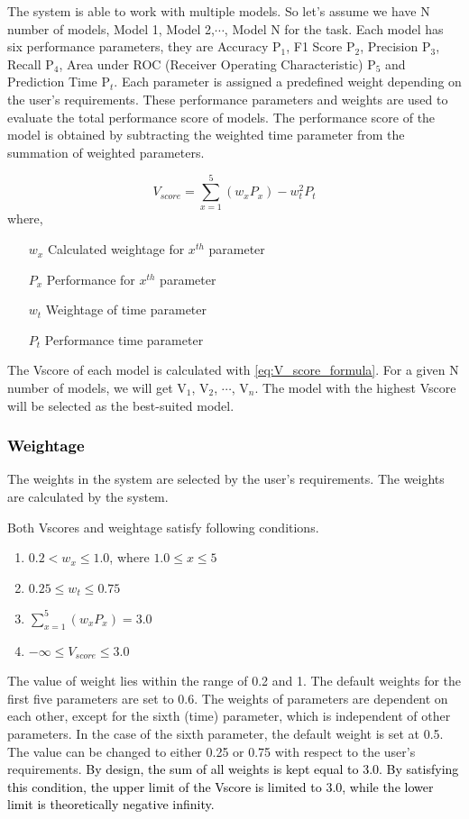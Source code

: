 \documentclass[a4paper,fleqn]{cas-dc}
\newcommand{\responsemod}{\color{black}}
\newcommand{\responsemodsm}[1]{\textcolor{black}{#1}}
\newcommand{\subsubsectionb}[1]{\subsubsection{\responsemodsm{#1}}}
\begin{document}
{\responsemod
    The system is able to work with multiple models. So let's assume we have N number of models, Model 1, Model 2,$\cdots$, Model N for the task. Each model has six performance parameters, they are Accuracy P$_1$, F1 Score P$_2$, Precision P$_3$, Recall P$_4$, Area under ROC (Receiver Operating Characteristic) P$_5$ and Prediction Time P$_t$. Each parameter is assigned a predefined weight depending on the user's requirements. These performance parameters and weights are used to evaluate the total performance score of models. The performance score of the model is obtained by subtracting the weighted time parameter from the summation of weighted parameters.

    \begin{equation}\label{eq:V_score_formula}
        V_{score} = \sum_{x=1}^5 \left(w_xP_x\right) - w_t^2P_t
    \end{equation}
    where,
    \vspace{-0.75em}
    \begin{itemize}
        \setlength{\itemsep}{-0.2em}
        \item[$w_x$] Calculated weightage for $x^{th}$ parameter
        \item[$P_x$] Performance for $x^{th}$ parameter
        \item[$w_t$] Weightage of time parameter
        \item[$P_t$] Performance time parameter
    \end{itemize}
}

The Vscore of each model is calculated with \cref{eq:V_score_formula}. For a given N number of models, we will get V$_1$, V$_2$, $\cdots$, V$_n$. The model with the highest Vscore will be selected as the best-suited model.

\subsubsectionb{Weightage}\label{subsubsec:weightage}

The weights in the system are selected by the user's requirements. The weights are calculated by the system.
{\responsemod
    Both Vscores and weightage satisfy following conditions.
    \vspace{-0.5em}
    \begin{enumerate}
        \item $0.2 < w_x \le 1.0$, where $1.0 \le x \le 5$
        \item $0.25 \le w_t \le 0.75$
        \item $\sum_{x=1}^5(w_xP_x) = 3.0$
        \item $-\infty \le V_{score} \le 3.0$
    \end{enumerate}
}
The value of weight lies within the range of 0.2 and 1. The default weights for the first five parameters are set to 0.6. The weights of parameters are dependent on each other, except for the sixth (time) parameter, which is independent of other parameters. In the case of the sixth parameter, the default weight is set at 0.5. The value can be changed to either 0.25 or 0.75 with respect to the user's requirements. \responsemodsm{By design, the sum of all weights is kept equal to 3.0. By satisfying this condition, the upper limit of the Vscore is limited to 3.0, while the lower limit is theoretically negative infinity.}
\end{document}
